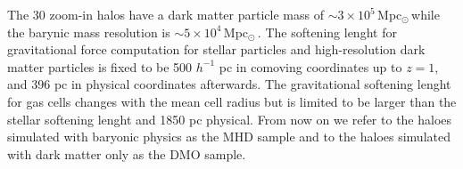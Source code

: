 \documentclass[usenatbib]{mnras}
\newcommand{\Msun}{\,{\rm Mpc}$_{\odot}$\,}
\begin{document}
The 30 zoom-in halos have a dark matter particle mass of $\sim 3\times
10^5$\Msun while the barynic mass resolution is $\sim 5\times 10^4$\Msun.
The softening lenght for gravitational force computation for stellar
particles and high-resolution dark matter particles 
is fixed to be 500 $h^{-1}$ pc in comoving coordinates up to $z=1$,
and 396 pc in physical coordinates afterwards.
The gravitational softening lenght for gas cells changes with the mean
cell radius but is limited to be larger than the stellar softening
lenght and 1850 pc physical. 
From now on we refer to the haloes simulated with baryonic physics as the
MHD sample and to the haloes simulated with dark matter only as the
DMO sample.


\begin{figure}
  \centering
  \hfill
  \hfill 


\end{figure}
\end{document}

